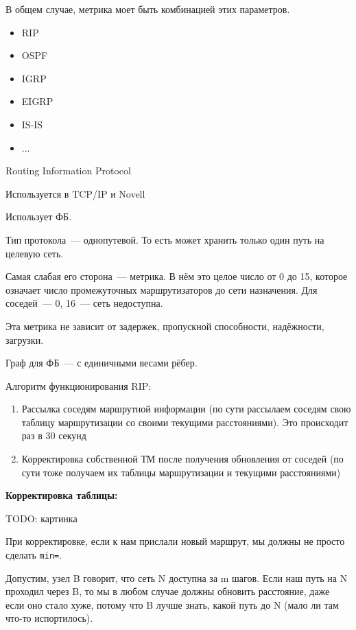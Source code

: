 В общем случае, метрика моет быть комбинацией этих параметров.


\begin{itemize}
    \item RIP
    \item OSPF
    \item IGRP
    \item EIGRP
    \item IS-IS
    \item ...
\end{itemize}


Routing Information Protocol

Используется в TCP/IP и Novell

Использует ФБ.

Тип протокола~--- однопутевой. То есть может хранить только один путь на целевую сеть.

Самая слабая его сторона~--- метрика. В нём это целое число от 0 до 15, которое означает число промежуточных маршрутизаторов до сети назначения. Для соседей~--- 0, 16~--- сеть недоступна.

Эта метрика не зависит от задержек, пропускной способности, надёжности, загрузки.

Граф для ФБ~--- с единичными весами рёбер.

Алгоритм функционирования RIP:
\begin{enumerate}
    \item Рассылка соседям маршрутной информации (по сути рассылаем соседям свою таблицу маршрутизации со своими текущими расстояниями). Это происходит раз в 30 секунд
    \item Корректировка собственной ТМ после получения обновления от соседей (по сути тоже получаем их таблицы маршрутизации и текущими расстояниями)
\end{enumerate}

{\bf Корректировка таблицы:}

TODO: картинка

При корректировке, если к нам прислали новый маршрут, мы должны не просто сделать {\tt min=}.

Допустим, узел B говорит, что сеть N доступна за m шагов. Если наш путь на N проходил через B, то мы в любом случае должны обновить расстояние, даже если оно стало хуже, потому что B лучше знать, какой путь до N (мало ли там что-то испортилось).

